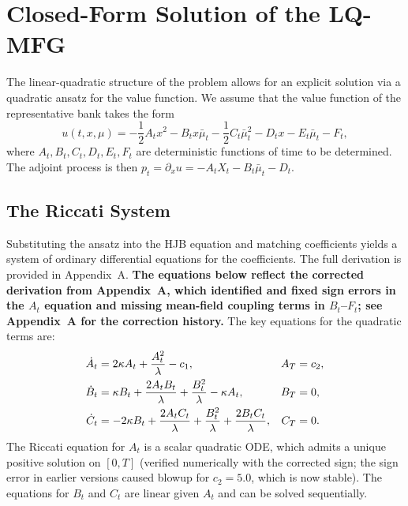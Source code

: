 \section{Closed-Form Solution of the LQ-MFG}
\label{sec:sr-closed-form}

The linear-quadratic structure of the problem allows for an explicit solution via a
quadratic ansatz for the value function. We assume that the value function of the
representative bank takes the form
\begin{equation}
    u(t,x,\mu) = -\frac{1}{2}A_t x^2 - B_t x \bar\mu_t - \frac{1}{2}C_t \bar\mu_t^2 -
    D_t x - E_t \bar\mu_t - F_t,
    \label{eq:sr-value-ansatz}
\end{equation}
where $A_t, B_t, C_t, D_t, E_t, F_t$ are deterministic functions of time to be
determined. The adjoint process is then
$p_t = \partial_x u = -A_t X_t - B_t \bar\mu_t - D_t$.

\subsection{The Riccati System}

Substituting the ansatz into the HJB equation and matching coefficients yields a
system of ordinary differential equations for the coefficients. The full derivation
is provided in Appendix~A. \textbf{The equations below reflect the corrected
derivation from Appendix~A, which identified and fixed sign errors in the $A_t$
equation and missing mean-field coupling terms in $B_t$--$F_t$; see Appendix~A
for the correction history.} The key equations for the quadratic terms are:
\begin{align}
    \dot{A}_t &= 2\kappa A_t + \frac{A_t^2}{\lambda} - c_1, & A_T &= c_2, \notag \\
    \dot{B}_t &= \kappa B_t + \frac{2A_t B_t}{\lambda} + \frac{B_t^2}{\lambda}
        - \kappa A_t, & B_T &= 0,
        \label{eq:sr-riccati-quadratic} \\
    \dot{C}_t &= -2\kappa B_t + \frac{2A_t C_t}{\lambda} + \frac{B_t^2}{\lambda}
        + \frac{2B_t C_t}{\lambda}, & C_T &= 0. \notag
\end{align}
The Riccati equation for $A_t$ is a scalar quadratic ODE, which admits a unique
positive solution on $[0,T]$ (verified numerically with the corrected sign; the
sign error in earlier versions caused blowup for $c_2 = 5.0$, which is now stable).
The equations for $B_t$ and $C_t$ are linear given $A_t$ and can be solved
sequentially.

